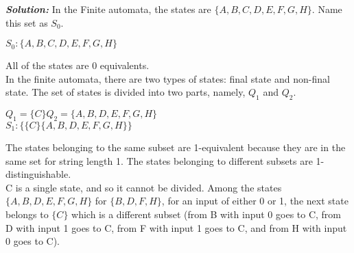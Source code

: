 \documentclass{article}
\begin{document}
\emph{\textbf{Solution:}} In the Finite automata, the states are $\{A, B, C, D, E, F, G, H\}$. Name this set as $S_0$.\\

\begin{center}
$S_0: \{A, B, C, D, E, F, G, H\}$
\end{center}

\vspace*{0.1cm}
\hspace*{0.2cm} All of the states are 0 equivalents.\\
In the finite automata, there are two types of states: final state and non-final state. The set of states is
divided into two parts, namely, $Q_1$ and $Q_2$.

\begin{center}
  $Q_1 = \{C\} Q_2 = \{A, B, D, E, F, G, H\}$ \\
  $S_1: \{\{C\} \{A, B, D, E, F, G, H\}\}$
\end{center}

\small{
The states belonging to the same subset are 1-equivalent because they are in the same set for string
length 1. The states belonging to different subsets are 1-distinguishable.\\
\hspace*{0.2cm} C is a single state, and so it cannot be divided. Among the states $\{A, B, D, E, F, G, H\}$ for $\{B, D, F, H\}$,
for an input of either 0 or 1, the next state belongs to $\{C\}$ which is a different subset (from B with input 0
goes to C, from D with input 1 goes to C, from F with input 1 goes to C, and from H with input 0 goes to C).}
\end{document}
